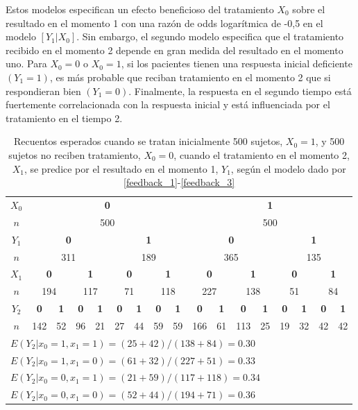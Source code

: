 \documentclass[spanish]{article}
\numberwithin{figure}{subsection}
\numberwithin{equation}{subsection}
\numberwithin{table}{subsection}
\begin{document}
Estos modelos especifican un efecto beneficioso del tratamiento $X_0$ sobre el resultado en el momento 1 con una razón de
odds logarítmica de -0,5 en el modelo $[Y_1|X_0]$. Sin embargo, el segundo modelo especifica que el tratamiento recibido
en el momento 2 depende en gran medida del resultado en el momento uno. Para $X_0 = 0$ o $X_0 = 1$, si los pacientes tienen
una respuesta inicial deficiente $(Y_1 = 1)$, es más probable que reciban tratamiento en el momento 2 que si respondieran
bien $(Y_1 = 0)$. Finalmente, la respuesta en el segundo tiempo está fuertemente correlacionada con la respuesta inicial
y está influenciada por el tratamiento en el tiempo 2.

\begin{table}[H]
	\label{feedback_table}
	\caption{Recuentos esperados cuando se tratan inicialmente 500 sujetos, $X_0 = 1$, y 500 sujetos no reciben tratamiento,
	$X_0 = 0$, cuando el tratamiento en el momento 2, $X_1$, se predice por el resultado en el momento 1, $Y_1$,
	según el modelo dado por \ref{feedback_1}-\ref{feedback_3}}
	\begin{tabular}{*{17}{c}}
		\hline
		$X_0$ & \multicolumn{8}{c}{\bf{0}} & \multicolumn{8}{c}{\bf{1}} \\[-3mm]
		$n$ & \multicolumn{8}{c}{500} & \multicolumn{8}{c}{500} \\
		$Y_1$ & \multicolumn{4}{c}{\bf{0}} & \multicolumn{4}{c}{\bf{1}} & \multicolumn{4}{c}{\bf{0}} & \multicolumn{4}{c}{\bf{1}} \\[-3mm]
		$n$ & \multicolumn{4}{c}{311} & \multicolumn{4}{c}{189} & \multicolumn{4}{c}{365} & \multicolumn{4}{c}{135} \\
		$X_1$ & \multicolumn{2}{c}{\bf{0}} & \multicolumn{2}{c}{\bf{1}} & \multicolumn{2}{c}{\bf{0}} & \multicolumn{2}{c}{\bf{1}} &
		\multicolumn{2}{c}{\bf{0}} & \multicolumn{2}{c}{\bf{1}} & \multicolumn{2}{c}{\bf{0}} & \multicolumn{2}{c}{\bf{1}} \\[-3mm]
		$n$ & \multicolumn{2}{c}{194} & \multicolumn{2}{c}{117} & \multicolumn{2}{c}{71} & \multicolumn{2}{c}{118} &
		\multicolumn{2}{c}{227} & \multicolumn{2}{c}{138} & \multicolumn{2}{c}{51} & \multicolumn{2}{c}{84} \\
		$Y_2$ & \bf{0} & \bf{1} & \bf{0} & \bf{1} & \bf{0} & \bf{1} & \bf{0} & \bf{1} & \bf{0} & \bf{1} & \bf{0} & \bf{1} &
		\bf{0} & \bf{1} & \bf{0} & \bf{1} \\[-3mm]
		$n$ & 142 & 52 & 96 & 21 & 27 & 44 & 59 & 59 & 166 & 61 & 113 & 25 & 19 & 32 & 42 & 42 \\
		\multicolumn{17}{l}{$ E(Y_2|x_0 = 1, x_1 = 1) = (25 + 42) / (138 + 84) = 0.30 $} \\
		\multicolumn{17}{l}{$ E(Y_2|x_0 = 1, x_1 = 0) = (61 + 32) / (227 + 51) = 0.33 $} \\
		\multicolumn{17}{l}{$ E(Y_2|x_0 = 0, x_1 = 1) = (21 + 59) / (117 + 118) = 0.34 $} \\
		\multicolumn{17}{l}{$ E(Y_2|x_0 = 0, x_1 = 0) = (52 + 44) / (194 + 71) = 0.36 $} \\
		\hline
	\end{tabular}
\end{table}
\end{document}
